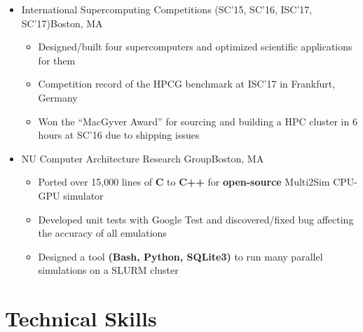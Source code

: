 \documentclass[11pt,letterpaper,sans]{moderncv}
\begin{document}
\begin{itemize}

\item[] {
{International Supercomputing Competitions (SC'15, SC'16, ISC'17, SC'17)}{Boston, MA}{}{\vspace{1pt}}
\vspace{-8pt}	\begin{itemize}
		\item Designed/built four supercomputers and optimized scientific applications for them
		\item Competition record of the HPCG benchmark at ISC'17 in Frankfurt, Germany
		\item Won the ``MacGyver Award'' for sourcing and building a HPC cluster in 6 hours at SC'16 due to shipping issues
		\end{itemize}
}
\vspace{6pt}


\item[] {
{NU Computer Architecture Research Group}{Boston, MA}{}{\vspace{1pt}}
\vspace{-8pt}	\begin{itemize}
		\item Ported over 15,000 lines of \textbf{C} to \textbf{C++} for \textbf{open-source} Multi2Sim CPU-GPU simulator
		\item Developed unit tests with Google Test and discovered/fixed bug affecting the accuracy of all emulations 
		\item Designed a tool \textbf{(Bash, Python, SQLite3)} to run many parallel simulations on a SLURM cluster
		\end{itemize}
		
}

\end{itemize}
\vspace{-6pt}


\section{Technical Skills}
\end{document}
